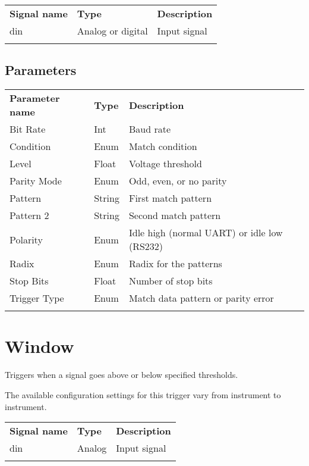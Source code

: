 \begin{tabularx}{16cm}{llX}
\thickhline
\textbf{Signal name} & \textbf{Type} & \textbf{Description} \\
\thickhline
din & Analog or digital & Input signal \\
\thickhline
\end{tabularx}

\subsection{Parameters}

\begin{tabularx}{16cm}{llX}
\thickhline
\textbf{Parameter name} & \textbf{Type} & \textbf{Description} \\
\thickhline
Bit Rate & Int & Baud rate \\
\thinhline
Condition & Enum & Match condition \\
\thinhline
Level & Float & Voltage threshold\\
\thinhline
Parity Mode & Enum & Odd, even, or no parity \\
\thinhline
Pattern & String & First match pattern\\
\thinhline
Pattern 2 & String & Second match pattern \\
\thinhline
Polarity & Enum & Idle high (normal UART) or idle low (RS232)\\
\thinhline
Radix & Enum & Radix for the patterns\\
\thinhline
Stop Bits & Float & Number of stop bits\\
\thinhline
Trigger Type & Enum & Match data pattern or parity error\\
\thickhline
\end{tabularx}


\section{Window}

Triggers when a signal goes above or below specified thresholds.

The available configuration settings for this trigger vary from instrument to instrument.

\begin{tabularx}{16cm}{llX}
\thickhline
\textbf{Signal name} & \textbf{Type} & \textbf{Description} \\
\thickhline
din & Analog & Input signal \\
\thickhline
\end{tabularx}

